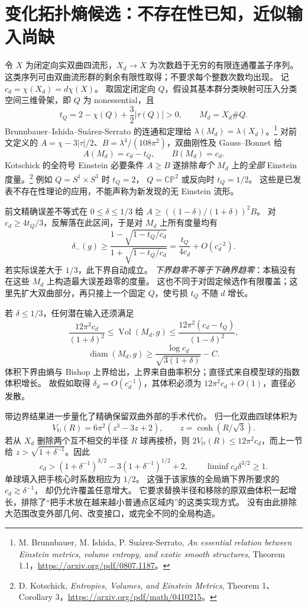 \documentclass[UTF8,fontset=fandol,zihao=-4,oneside,openany]{ctexbook}
\theoremstyle{cjkplain}
\numberwithin{equation}{chapter}
\begin{document}
\section{变化拓扑熵候选：不存在性已知，近似输入尚缺}
\label{FND:varyingentropy}

令 \(X\) 为闭定向实双曲四流形，\(X_d\to X\) 为次数趋于无穷的有限连通覆盖子序列。
这类序列可由双曲流形群的剩余有限性取得；不要求每个整数次数均出现。
记 \(c_d=\chi(X_d)=d\chi(X)\)。
取固定闭定向 \(Q\)，假设其基本群分类映射可压入分类空间三维骨架，即 \(Q\) 为 nonessential，且
\[
t_Q=2-\chi(Q)+\frac32|\tau(Q)|>0,\qquad M_d=X_d\#Q.
\]
Brunnbauer--Ishida--Suárez-Serrato 的连通和定理给
\(\lambda(M_d)=\lambda(X_d)\)。\footnote{M. Brunnbauer, M. Ishida, P. Suárez-Serrato, \emph{An essential relation between Einstein metrics, volume entropy, and exotic smooth structures}, Theorem 1.1，\url{https://arxiv.org/pdf/0807.1187}。}
对前文定义的
\(A=\chi-3|\tau|/2\)、\(B=\lambda^4/(108\pi^2)\)，双曲刚性及 Gauss--Bonnet 给
\[
A(M_d)=c_d-t_Q,\qquad B(M_d)=c_d.
\]
Kotschick 的全符号 Einstein 必要条件 \(A\ge B\) 遂排除\emph{每个} \(M_d\) 上的\emph{全部} Einstein 度量。\footnote{D. Kotschick, \emph{Entropies, Volumes, and Einstein Metrics}, Theorem 1、Corollary 3，\url{https://arxiv.org/pdf/math/0410215}。}
例如 \(Q=S^1\times S^3\) 时 \(t_Q=2\)，
\(Q=\mathbb{CP}^2\) 或反向时 \(t_Q=1/2\)。
这些是已发表不存在性理论的应用，不能声称为新发现的无 Einstein 流形。

前文精确误差不等式在 \(0\le\delta\le1/3\) 给
\(A\ge((1-\delta)/(1+\delta))^2B\)。
对 \(c_d\ge4t_Q/3\)，反解落在此区间，于是对 \(M_d\) 上所有度量均有
\[
\delta_-(g)\ge
\frac{1-\sqrt{1-t_Q/c_d}}{1+\sqrt{1-t_Q/c_d}}
=\frac{t_Q}{4c_d}+O(c_d^{-2}).
\]
若实际误差大于 \(1/3\)，此下界自动成立。
\emph{下界趋零不等于下确界趋零}：本稿没有在这些 \(M_d\) 上构造最大误差趋零的度量。
这也不同于对固定候选作有限覆盖；这里先扩大双曲部分，再只接上一个固定 \(Q\)，使亏损 \(t_Q\) 不随 \(d\) 增长。

若 \(\delta\le1/3\)，任何潜在输入还须满足
\[
\frac{12\pi^2c_d}{(1+\delta)^2}
\le\operatorname{Vol}(M_d,g)
\le\frac{12\pi^2(c_d-t_Q)}{(1-\delta)^2},
\]
\[
\operatorname{diam}(M_d,g)
\ge\frac{\log c_d}{\sqrt{3(1+\delta)}}-C.
\]
体积下界由熵与 Bishop 上界给出，上界来自曲率积分；直径式来自模型球的指数体积增长。
故假如取得 \(\delta_d=O(c_d^{-1})\)，其体积必须为 \(12\pi^2c_d+O(1)\)，直径必发散。

带边界结果进一步量化了精确保留双曲外部的手术代价。
归一化双曲四球体积为
\[
V_{\mathbb H}(R)=6\pi^2(z^3-3z+2),\qquad z=\cosh(R/\sqrt3).
\]
若从 \(X_d\) 删除两个互不相交的半径 \(R\) 球再接桥，则
\(2V_{\mathbb H}(R)\le12\pi^2c_d\)，而上一节给
\(z>\sqrt{1+\delta^{-1}}\)。因此
\[
c_d>(1+\delta^{-1})^{3/2}-3(1+\delta^{-1})^{1/2}+2,
\qquad\liminf c_d\delta^{3/2}\ge1.
\]
单球填入把手核心时系数相应为 \(1/2\)。
这强于该家族的全局熵下界所要求的 \(c_d\gtrsim\delta^{-1}\)，
却仍允许覆盖任意增大。
它要求替换半径和移除的原双曲体积一起增长，排除了“把手术放在越来越小普通点区域内”的这类实现方式。
没有由此排除大范围改变外部几何、改变接口，或完全不同的全局构造。
\end{document}
